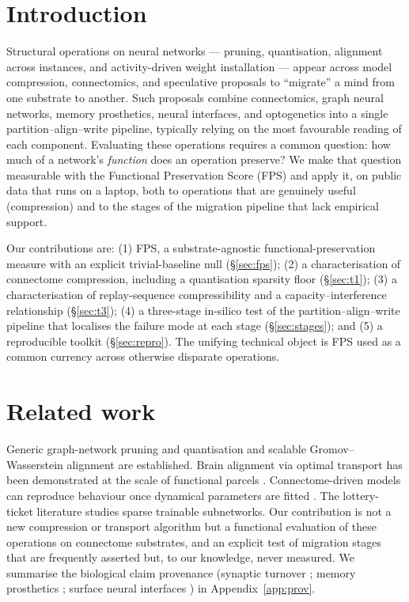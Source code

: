 \documentclass[10pt]{article}
\begin{document}
\section{Introduction}
Structural operations on neural networks --- pruning, quantisation, alignment across instances,
and activity-driven weight installation --- appear across model compression, connectomics, and
speculative proposals to ``migrate'' a mind from one substrate to another. Such proposals combine
connectomics, graph neural networks, memory prosthetics, neural interfaces, and optogenetics into
a single partition--align--write pipeline, typically relying on the most favourable reading of
each component. Evaluating these operations requires a common question: how much of a network's
\emph{function} does an operation preserve? We make that question measurable with the Functional
Preservation Score (FPS) and apply it, on public data that runs on a laptop, both to operations
that are genuinely useful (compression) and to the stages of the migration pipeline that lack
empirical support.

Our contributions are: (1) FPS, a substrate-agnostic functional-preservation measure with an
explicit trivial-baseline null (\S\ref{sec:fps}); (2) a characterisation of connectome
compression, including a quantisation sparsity floor (\S\ref{sec:t1}); (3) a characterisation of
replay-sequence compressibility and a capacity--interference relationship (\S\ref{sec:t3}); (4) a
three-stage in-silico test of the partition--align--write pipeline that localises the failure mode
at each stage (\S\ref{sec:stages}); and (5) a reproducible toolkit (\S\ref{sec:repro}). The
unifying technical object is FPS used as a common currency across otherwise disparate operations.

\section{Related work}
Generic graph-network pruning and quantisation \citep{gnnprunequant2025} and scalable
Gromov--Wasserstein alignment \citep{xu2019gwl,xu2019sgwl,peyre2016gw} are established. Brain
alignment via optimal transport has been demonstrated at the scale of functional parcels
\citep{thual2022fugw}. Connectome-driven models can reproduce behaviour once dynamical parameters
are fitted \citep{dorkenwald2024flywire,flygnn2025}. The lottery-ticket literature
\citep{frankle2019lottery} studies sparse trainable subnetworks. Our contribution is not a new
compression or transport algorithm but a functional evaluation of these operations on connectome
substrates, and an explicit test of migration stages that are frequently asserted but, to our
knowledge, never measured. We summarise the biological claim provenance (synaptic turnover
\citep{vonderohe2006torpor}; memory prosthetics \citep{hampson2018prosthetic}; surface neural
interfaces \citep{jung2025bisc}) in Appendix~\ref{app:prov}.
\end{document}

